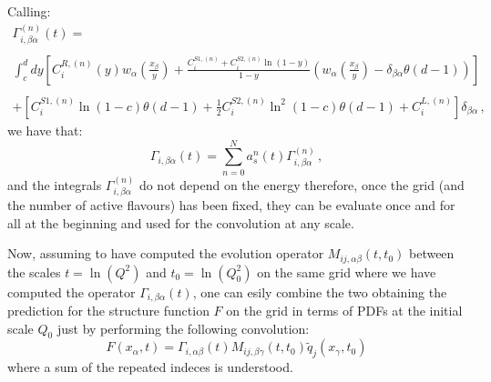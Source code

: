 \documentclass[10pt,a4paper]{article}
\begin{document}
Calling:
\begin{equation}
\begin{array}{c}
\displaystyle \Gamma_{i,\beta\alpha}^{(n)}(t) = \\
\\
\displaystyle \int^{d}_{c}dy\left[{C}_{i}^{R,(n)}(y)w_{\alpha}\left(\frac{x_\beta}{y}\right)+\frac{{C}_{i}^{S1,(n)}+{C}_{i}^{S2,(n)}\ln(1-y)}{1-y}\left(w_{\alpha}\left(\frac{x_\beta}{y}\right)-\delta_{\beta\alpha}\theta(d-1)\right)\right]\\
\\
\displaystyle +\left[{C}_{i}^{S1,(n)}\ln(1-c)\theta(d-1)+\frac12{C}_{i}^{S2,(n)}\ln^2(1-c)\theta(d-1)+{C}_{i}^{L,(n)}\right]\delta_{\beta\alpha}\,,
\end{array}
\end{equation}
we have that:
\begin{equation}\label{splittingexp}
\Gamma_{i,\beta\alpha}(t) = \sum_{n=0}^{N} a_s^{n}(t) \Gamma_{i,\beta\alpha}^{(n)}\,,
\end{equation}
and the integrals $\Gamma_{i,\beta\alpha}^{(n)}$ do not depend on the energy therefore, once the grid (and the number of active flavours) has been fixed, they can be evaluate once and for all at the beginning and used for the convolution at any scale.

Now, assuming to have computed the evolution operator
$M_{ij,\alpha\beta}(t,t_0)$ between the
scales $t=\ln(Q^2)$ and $t_0=\ln(Q_0^2)$ on the same grid where we
have computed the operator $\Gamma_{i,\beta\alpha}(t)$, one can esily
combine the two obtaining the prediction for the structure function
$F$ on the grid in terms of PDFs at the initial scale $Q_0$ just by performing the
following convolution:
\begin{equation}
F(x_\alpha,t) = \Gamma_{i,\alpha\beta}(t) M_{ij,\beta\gamma}(t,t_0) \tilde{q}_j(x_{\gamma},t_0)
\end{equation}
where a sum of the repeated indeces is understood.
\end{document}
